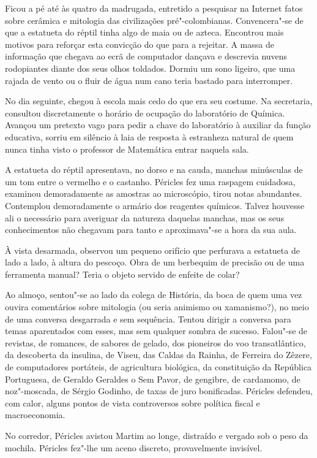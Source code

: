 Ficou a pé até às quatro da madrugada, entretido a pesquisar
na Internet fatos sobre cerâmica e mitologia das civilizações
pré"-colombianas. Convencera"-se de que a estatueta do réptil tinha algo
de maia ou de azteca. Encontrou mais motivos para reforçar esta
convicção do que para a rejeitar. A massa de informação que chegava ao
ecrã de computador dançava e descrevia nuvens rodopiantes diante dos
seus olhos toldados. Dormiu um sono ligeiro, que uma rajada de vento ou
o fluir de água num cano teria bastado para interromper.

No dia seguinte, chegou à escola mais cedo do que era seu costume. Na
secretaria, consultou discretamente o horário de ocupação do laboratório
de Química. Avançou um pretexto vago para pedir a chave do laboratório à
auxiliar da função educativa, sorriu em silêncio à laia de resposta à
estranheza natural de quem nunca tinha visto o professor de Matemática
entrar naquela sala.

A estatueta do réptil apresentava, no dorso e na cauda, manchas
minúsculas de um tom entre o vermelho e o castanho. Péricles fez uma
raspagem cuidadosa, examinou demoradamente as amostras ao microscópio,
tirou notas abundantes. Contemplou demoradamente o armário dos
reagentes químicos. Talvez houvesse ali o necessário para averiguar da
natureza daquelas manchas, mas os seus conhecimentos não chegavam para
tanto e aproximava"-se a hora da sua aula.

À vista desarmada, observou um pequeno orifício que perfurava a
estatueta de lado a lado, à altura do pescoço. Obra de um berbequim de
precisão ou de uma ferramenta manual? Teria o objeto servido de enfeite
de colar?

Ao almoço, sentou"-se ao lado da colega de História, da boca de quem uma
vez ouvira comentários sobre mitologia (ou seria animismo ou
xamanismo?), no meio de uma conversa desgarrada e sem sequência.
Tentou dirigir a conversa para temas
aparentados com esses, mas sem qualquer sombra de sucesso. Falou"-se de
revistas, de romances, de sabores de gelado, dos pioneiros do voo
transatlântico, da descoberta da insulina, de Viseu, das Caldas da
Rainha, de Ferreira do Zêzere, de computadores portáteis, de agricultura
biológica, da constituição da República Portuguesa, de Geraldo
Geraldes o Sem Pavor, de gengibre, de cardamomo, de noz"-moscada, de
Sérgio Godinho, de taxas de juro bonificadas. Péricles defendeu, com
calor, alguns pontos de vista controversos sobre política fiscal e
macroeconomia.

No corredor, Péricles avistou Martim ao longe, distraído e vergado sob o
peso da mochila. Péricles fez"-lhe um aceno discreto, provavelmente
invisível.

